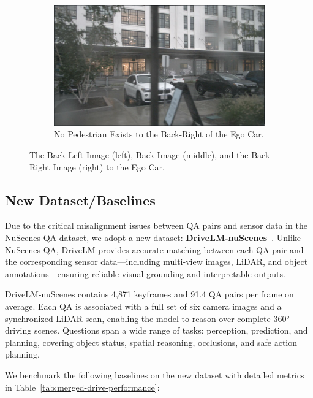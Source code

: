 \documentclass{article} %
\begin{document}
\begin{itemize}
\begin{figure}[H]
\begin{subfigure}[t]{0.3\textwidth}
        \includegraphics[width=\linewidth]{Figures/exam3_back_right_ped.png}
        \caption{\small No Pedestrian Exists to the Back-Right of the Ego Car.}
    \end{subfigure}
    \caption{The Back-Left Image (left), Back Image (middle), and the Back-Right Image (right) to the Ego Car.}
    \label{fig:misaligned-examples}
\end{figure}   

\end{itemize}


\subsection{New Dataset/Baselines}
Due to the critical misalignment issues between QA pairs and sensor data in the NuScenes-QA dataset, we adopt a new dataset: \textbf{DriveLM-nuScenes}~\cite{gopalkrishnan2024multi}. Unlike NuScenes-QA, DriveLM provides accurate matching between each QA pair and the corresponding sensor data—including multi-view images, LiDAR, and object annotations—ensuring reliable visual grounding and interpretable outputs.

DriveLM-nuScenes contains 4,871 keyframes and 91.4 QA pairs per frame on average. Each QA is associated with a full set of six camera images and a synchronized LiDAR scan, enabling the model to reason over complete 360° driving scenes. Questions span a wide range of tasks: perception, prediction, and planning, covering object status, spatial reasoning, occlusions, and safe action planning.

We benchmark the following baselines on the new dataset with detailed metrics in Table~\ref{tab:merged-drive-performance}:
\end{document}
